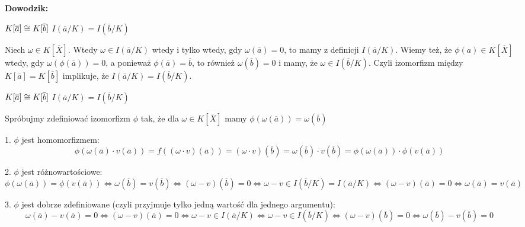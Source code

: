 \textbf{Dowodzik:}

$K[\overline a]\cong K[\overline b]$ \acc{$\implies$} $I(\overline a/K)=I(\overline b/K)$

Niech $\omega\in K[\overline X]$. Wtedy $\omega\in I(\overline a/K)$ wtedy i tylko wtedy, gdy $\omega(\overline a)=0$, to mamy z definicji $I(\overline a/K)$. Wiemy też, że $\phi(a)\in K[\overline X]$ wtedy, gdy $\omega(\phi(\overline a))=0$, a ponieważ $\phi(\overline a)=\overline b$, to również $\omega(\overline b)=0$ i mamy, że $\omega\in I(\overline b/K)$. Czyli izomorfizm między $K[\overline a]=K[\overline b]$ implikuje, że $I(\overline a/K)=I(\overline b/K)$.
\smallskip

$K[\overline a]\cong K[\overline b]$ \acc{$\impliedby$} $I(\overline a/K)=I(\overline b/K)$

Spróbujmy zdefiniować izomorfizm $\phi$ tak, że dla $\omega\in K[\overline X]$ mamy $\phi(\omega(\overline a))=\omega(\overline b)$

1. $\phi$ jest homomorfizmem: 
$$\phi(\omega(\overline a)\cdot v(\overline a))=f((\omega\cdot v)(\overline a))=(\omega\cdot v)(\overline b)=\omega(\overline b)\cdot v(\overline b)=\phi(\omega(\overline a))\cdot \phi(v(\overline a))$$

2. $\phi$ jest różnowartościowe:
$$\phi(\omega(\overline a))=\phi(v(\overline a))\iff \omega(\overline b)=v(\overline b)\iff (\omega-v)(\overline b)=0\iff \omega-v\in I(\overline b/K)=I(\overline a/K)\iff (\omega-v)(\overline a)=0\iff \omega(\overline a)=v(\overline a)$$

3. $\phi$ jest dobrze zdefiniowane (czyli przyjmuje tylko jedną wartość dla jednego argumentu):
$$\omega(\overline a)-v(\overline a)=0\iff (\omega-v)(\overline a)=0\iff \omega -v\in I(\overline a/K)\iff \omega-v\in I(\overline b/K)\iff (\omega-v)(\overline b)=0\iff \omega(\overline b)-v(\overline b)=0$$

